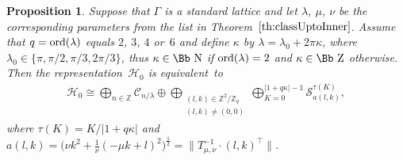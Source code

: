 \documentclass[pdftex]{sigma}
\newcommand\NN{{\mbox{\Bb N}}}
\newcommand\ZZ{{\mbox{\Bb Z}}}
\newcommand\Z{{\mathbb Z}}
\newcommand\cC{{\mathcal C}}
\newcommand\cH{{\mathcal H}}
\newcommand{\ord}{{\rm ord}}
\numberwithin{equation}{section}
\newtheorem{Proposition}[Theorem]{Proposition}
 { \theoremstyle{definition}
\newtheorem{Definition}[Theorem]{Definition}
\newtheorem{Note}[Theorem]{Note}
\newtheorem{Example}[Theorem]{Example}
\newtheorem{Remark}[Theorem]{Remark} }
\begin{document}
\begin{Proposition} \label{pr:H0}
Suppose that $\Gamma$ is a standard lattice and let $\lambda$, $\mu$, $\nu$ be the corresponding parameters from the list in Theorem~$\ref{th:classUptoInner}$. Assume that $q=\ord(\lambda)$ equals $2$, $3$, $4$ or~$6$ and define $\kappa$ by $\lambda=\lambda_0+2\pi\kappa$, where $\lambda_0\in\{\pi,\pi/2,\pi/3,2\pi/3\}$, thus $\kappa\in\NN$ if $\ord(\lambda)=2$ and $\kappa\in\ZZ$ otherwise.
Then the representation~$\cH_0$ is equivalent~to
\begin{gather*}
\cH_0\cong\bigoplus_{n\in \Z} \cC_{n/\lambda} \oplus \bigoplus _{\substack{(l,k)\in\Z^2/\Z_q\\(l,k)\not=(0,0)}} \bigoplus_{K=0}^{|1+q\kappa|-1} {\mathcal S}_{a(l,k)}^{\tau(K)},
\end{gather*}
where $\tau(K)=K/|1+q\kappa|$ and $a(l,k)=\big(\nu k^2 +\frac1\nu(-\mu k+l)^2\big)^{\frac12}=\big\|T_{\mu,\nu}^{-1}\cdot(l,k)^\top\big\|$.
\end{Proposition}
\end{document}
